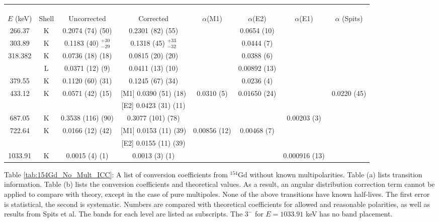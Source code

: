 \begin{landscape}
\begin{table}
    \centering
\begin{ThreePartTable}
    \centering
    \begin{tabular}{>{\footnotesize}c|>{\footnotesize}c|>{\footnotesize}c|>{\footnotesize}c|>{\footnotesize}c|>{\footnotesize}c|>{\footnotesize}c|>{\footnotesize}c}
        \multicolumn{7}{>{\fontsize{12}{15}}c}{TABLE 4.5 (CONTINUED)}\\
        \multicolumn{7}{>{\fontsize{12}{15}}c}{(b)}\\
        \toprule
        &	& \multicolumn{2}{>{\footnotesize}c|}{$\alpha$ (This Work) } & \multicolumn{3}{>{\footnotesize}c|}{Theory\citep{kibedi08:_BRICC}}	& 	\\ 
        $E$ (keV)	& Shell & 	Uncorrected & Corrected 	& $\alpha$(M1) & $\alpha$(E2) & $\alpha$(E1) &	$\alpha$ (Spits)\citep{spits96:_154gd}	\\
	    \hline
	    266.37	& K &	0.2074	(74) (50) & 0.2301 (82) (55) &  & 0.0654 (10) & & \\ \hline
	    303.89	& K &	0.1183	(40) $^{+30}_{-29}$  & 0.1318 (45) $^{+33}_{-32}$ & & 0.0444 (7) & & \\ \hline
	    318.382	& K &	0.0736	(18) (18)  & 0.0815 (20) (20) & & 0.0388 (6) & &\\
	    		& L & 	0.0371	(12) (9) & 0.0411 (13) (10)	& & 0.00892 (13) & &	\\  \hline
	    379.55	& K & 	0.1120	(60) (31) & 0.1245 (67) (34)&  & 0.0236 (4) & & \\ \hline
        433.12	& K &	0.0571	(42) (15) & [M1] 0.0390 (51) (18) & 0.0310 (5) & 0.01650 (24) &	& 0.0220 (45)\\ 
        	&	& & [E2] 0.0423 (31) (11) & & &	& \\ \hline
        687.05	& K & 0.3538 (116) (90) & 0.3077 (101) (78)	& & & 0.00203 (3) &\\ \hline
        722.64	& K		&	0.0166	(12) (42) & [M1] 0.0153 (11) (39)	& 0.00856 (12) & 0.00468 (7) & &		\\
        &	& &  [E2] 0.0155 (11) (39) & & &	& \\ \hline
        1033.91	& K	&	0.0015	(4) (1) & 0.0013 (3) (1)	& & & 0.000916 (13) &	\\
        \bottomrule
    \end{tabular}
    \makeatletter\def\TPT@hsize{}\makeatletter
\begin{tablenotes}[para]
    Table \ref{tab:154Gd_No_Mult_ICC}: A list of conversion coefficients from $^{154}$Gd without known multipolarities. Table (a) lists transition information. Table (b) lists the conversion coefficients and theoretical values. As a result, an angular distribution correction term cannot be applied to compare with theory, except in the case of pure multipoles. None of the above transitions have known half-lives. The first error is statistical, the second is systematic. Numbers are compared with theoretical coefficients for allowed and reasonable polarities, as well as results from Spits et al. \cite{spits96:_154gd} The bands for each level are listed as subscripts. The $3^-$ for $E=1033.91$ keV has no band placement.

\end{tablenotes}
\end{ThreePartTable}
\end{table}
\end{landscape}
